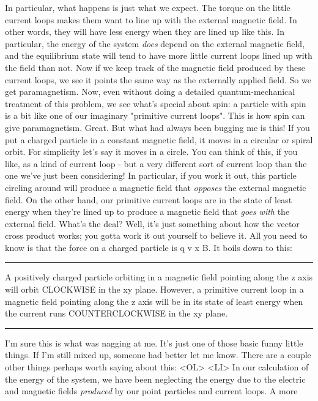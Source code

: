 In particular, what happens is just what we expect.  The torque on
the little current loops makes them want to line up with the external
magnetic field.  In other words, they will have less energy when they 
are lined up like this.  In particular, the energy of the system
\emph{does} depend on the external magnetic field, and the equilibrium
state will tend to have more little current loops lined up with the field
than not.
Now if we keep track of the magnetic field produced by these current
loops, we see it points the same way as the externally applied field.
So we get paramagnetism.
Now, even without doing a detailed quantum-mechanical treatment of
this problem, we see what's special about spin: a particle with
spin is a bit like one of our imaginary "primitive current loops".
This is how spin can give paramagnetism.  
Great.  But what had always been bugging me is this!  If you
put a charged particle in a constant magnetic field, it moves
in a circular or spiral orbit.  For simplicity let's say it moves
in a circle.  You can think of this, if you like, as a kind of current
loop - but a very different sort of current loop than the one we've 
just been considering!  In particular, if you work it out, this particle
circling around will produce a magnetic field that \emph{opposes} the 
external magnetic field.  On the other hand, our primitive current 
loops are in the state of least energy when they're lined up to produce 
a magnetic field that \emph{goes with} the external field.  
What's the deal?  Well, it's just something about how the vector cross
product works; you gotta work it out yourself to believe it.   All
you need to know is that the force on a charged particle is q v x B.
It boils down to this:
\par\noindent\rule{\textwidth}{0.4pt}
A positively charged particle orbiting in a magnetic field pointing
along the z axis will orbit CLOCKWISE in the xy plane.  However,
a primitive current loop in a magnetic field pointing along
the z axis will be in its state of least energy when the current
runs COUNTERCLOCKWISE in the xy plane.
\par\noindent\rule{\textwidth}{0.4pt}
I'm sure this is what was nagging at me.  It's just one of those
basic funny little things.  If I'm still mixed up, someone
had better let me know.  
There are a couple other things perhaps worth saying about this:
<OL>
<LI> In our calculation of the energy of the system, we have
been neglecting the energy due to the electric and magnetic fields
\emph{produced} by our point particles and current loops.  A more

